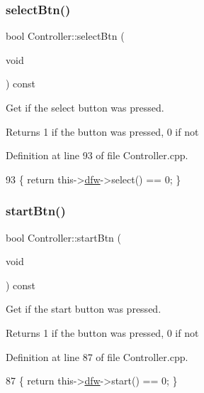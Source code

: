 \subsubsection{\texorpdfstring{select\+Btn()}{selectBtn()}}
{\footnotesize\ttfamily bool Controller\+::select\+Btn (\begin{DoxyParamCaption}\item[{void}]{ }\end{DoxyParamCaption}) const}



Get if the select button was pressed. 

\begin{DoxyReturn}{Returns}
1 if the button was pressed, 0 if not 
\end{DoxyReturn}


Definition at line 93 of file Controller.\+cpp.


\begin{DoxyCode}
93 \{ \textcolor{keywordflow}{return} this->\hyperlink{class_controller_af4793ccbf2ecdbfcdb9359bd32b6e8cf}{dfw}->select() == 0; \}
\end{DoxyCode}
\mbox{\label{class_controller_a79a29dd5d92150135f2abbfa01b082dc}} 
\subsubsection{\texorpdfstring{start\+Btn()}{startBtn()}}
{\footnotesize\ttfamily bool Controller\+::start\+Btn (\begin{DoxyParamCaption}\item[{void}]{ }\end{DoxyParamCaption}) const}



Get if the start button was pressed. 

\begin{DoxyReturn}{Returns}
1 if the button was pressed, 0 if not 
\end{DoxyReturn}


Definition at line 87 of file Controller.\+cpp.


\begin{DoxyCode}
87 \{ \textcolor{keywordflow}{return} this->\hyperlink{class_controller_af4793ccbf2ecdbfcdb9359bd32b6e8cf}{dfw}->start() == 0; \}
\end{DoxyCode}
\mbox{\label{class_controller_af52a1a5515bdf3be57bbab75b2b79e5a}} 
